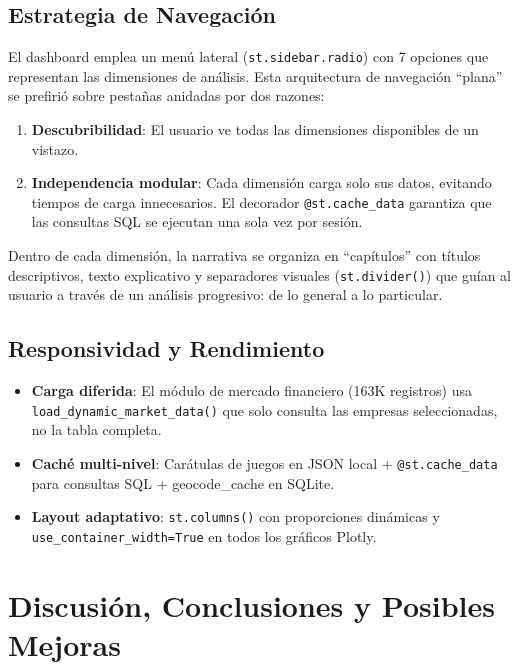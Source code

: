 \documentclass[11pt,a4paper]{article}
\begin{document}
\subsection{Estrategia de Navegación}

El dashboard emplea un menú lateral (\texttt{st.sidebar.radio}) con 7 opciones que representan las dimensiones de análisis. Esta arquitectura de navegación ``plana'' se prefirió sobre pestañas anidadas por dos razones:

\begin{enumerate}
  \item \textbf{Descubribilidad}: El usuario ve todas las dimensiones disponibles de un vistazo.
  \item \textbf{Independencia modular}: Cada dimensión carga solo sus datos, evitando tiempos de carga innecesarios. El decorador \texttt{@st.cache\_data} garantiza que las consultas SQL se ejecutan una sola vez por sesión.
\end{enumerate}

Dentro de cada dimensión, la narrativa se organiza en ``capítulos'' con títulos descriptivos, texto explicativo y separadores visuales (\texttt{st.divider()}) que guían al usuario a través de un análisis progresivo: de lo general a lo particular.

\subsection{Responsividad y Rendimiento}

\begin{itemize}
  \item \textbf{Carga diferida}: El módulo de mercado financiero (163K registros) usa \texttt{load\_dynamic\_market\_data()} que solo consulta las empresas seleccionadas, no la tabla completa.
  \item \textbf{Caché multi-nivel}: Carátulas de juegos en JSON local + \texttt{@st.cache\_data} para consultas SQL + geocode\_cache en SQLite.
  \item \textbf{Layout adaptativo}: \texttt{st.columns()} con proporciones dinámicas y \texttt{use\_container\_width=True} en todos los gráficos Plotly.
\end{itemize}


\newpage
\section{Discusión, Conclusiones y Posibles Mejoras}
\end{document}
